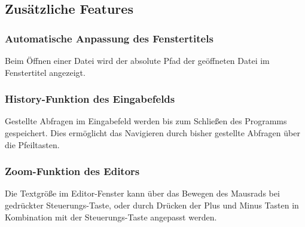 \documentclass[parskip=full,11pt,twoside]{scrartcl}
\begin{document}
\subsection{Zusätzliche Features}
	\subsubsection{Automatische Anpassung des Fenstertitels}
		Beim Öffnen einer Datei wird der absolute Pfad der geöffneten Datei im Fenstertitel angezeigt.
	
	\subsubsection{History-Funktion des Eingabefelds}
		Gestellte Abfragen im Eingabefeld werden bis zum Schließen des Programms gespeichert. Dies ermöglicht das Navigieren durch bisher gestellte Abfragen über die Pfeiltasten.
		
	\subsubsection{Zoom-Funktion des Editors}
		Die Textgröße im Editor-Fenster kann über das Bewegen des Mausrads bei gedrückter Steuerungs-Taste, oder durch Drücken der Plus und Minus Tasten in Kombination mit der Steuerungs-Taste angepasst werden.
\end{document}
